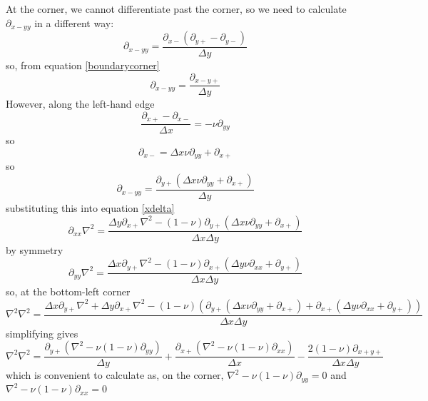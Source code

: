 \documentclass[a4paper]{article}
\begin{document}
At the corner, we cannot differentiate past the corner, so we need to calculate $\partial_{x-yy}$ in a different way:
\[
\partial_{x-yy} = \frac{\partial_{x-}(\partial_{y+} - \partial_{y-})}{\Delta y}
\]
so, from equation \ref{boundarycorner}
\[
\partial_{x-yy} = \frac{\partial_{x-y+}}{\Delta y}
\]
However,  along the left-hand edge
\[
\frac{\partial_{x+} - \partial_{x-}}{\Delta x}=-\nu\partial_{yy}
\]
so
\[
 \partial_{x-}=\Delta x\nu\partial_{yy} + \partial_{x+}
\]
so
\[
\partial_{x-yy} = \frac{\partial_{y+}(\Delta x\nu\partial_{yy} + \partial_{x+})}{\Delta y}
\]
substituting this into equation \ref{xdelta}
\[
\partial_{xx}\nabla^2 = \frac{\Delta y\partial_{x+}\nabla^2 - (1-\nu)\partial_{y+}(\Delta x\nu\partial_{yy} + \partial_{x+})}{\Delta x\Delta y}
\]
by symmetry
\[
\partial_{yy}\nabla^2 = \frac{\Delta x\partial_{y+}\nabla^2 - (1-\nu)\partial_{x+}(\Delta y\nu\partial_{xx} + \partial_{y+})}{\Delta x\Delta y}
\]
so, at the bottom-left corner
\begin{equation}
\nabla^2\nabla^2 = \frac{\Delta x\partial_{y+}\nabla^2 + \Delta y\partial_{x+}\nabla^2 - (1-\nu)(\partial_{y+}(\Delta x\nu\partial_{yy} + \partial_{x+}) + \partial_{x+}(\Delta y\nu\partial_{xx} + \partial_{y+}))}{\Delta x\Delta y}
\end{equation}
simplifying gives
\begin{equation}
\nabla^2\nabla^2 = \frac{\partial_{y+}(\nabla^2- \nu(1-\nu)\partial_{yy})}{\Delta y} + \frac{\partial_{x+}(\nabla^2-\nu(1-\nu)\partial_{xx} )}{\Delta x} - \frac{2(1-\nu)\partial_{x+y+}}{\Delta x\Delta y}
\end{equation}
which is convenient to calculate as, on the corner, $\nabla^2 - \nu(1-\nu)\partial_{yy} = 0$ and $\nabla^2 - \nu(1-\nu)\partial_{xx} = 0$

\end{document}
